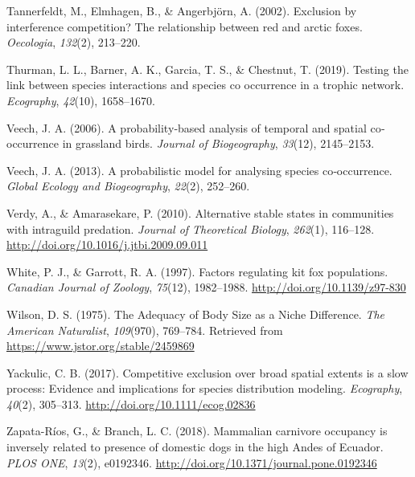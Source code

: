 \documentclass[12pt,twoside]{reedthesis}
\begin{document}
\leavevmode\hypertarget{ref-tannerfeldt_exclusion_2002}{}%
Tannerfeldt, M., Elmhagen, B., \& Angerbjörn, A. (2002). Exclusion by interference competition? The relationship between red and arctic foxes. \emph{Oecologia}, \emph{132}(2), 213--220.

\leavevmode\hypertarget{ref-thurman_testing_2019}{}%
Thurman, L. L., Barner, A. K., Garcia, T. S., \& Chestnut, T. (2019). Testing the link between species interactions and species co occurrence in a trophic network. \emph{Ecography}, \emph{42}(10), 1658--1670.

\leavevmode\hypertarget{ref-veech_probabilitybased_2006}{}%
Veech, J. A. (2006). A probability‐based analysis of temporal and spatial co‐occurrence in grassland birds. \emph{Journal of Biogeography}, \emph{33}(12), 2145--2153.

\leavevmode\hypertarget{ref-veech_probabilistic_2013}{}%
Veech, J. A. (2013). A probabilistic model for analysing species co‐occurrence. \emph{Global Ecology and Biogeography}, \emph{22}(2), 252--260.

\leavevmode\hypertarget{ref-verdy_alternative_2010}{}%
Verdy, A., \& Amarasekare, P. (2010). Alternative stable states in communities with intraguild predation. \emph{Journal of Theoretical Biology}, \emph{262}(1), 116--128. \url{http://doi.org/10.1016/j.jtbi.2009.09.011}

\leavevmode\hypertarget{ref-white_factors_1997}{}%
White, P. J., \& Garrott, R. A. (1997). Factors regulating kit fox populations. \emph{Canadian Journal of Zoology}, \emph{75}(12), 1982--1988. \url{http://doi.org/10.1139/z97-830}

\leavevmode\hypertarget{ref-wilson_adequacy_1975}{}%
Wilson, D. S. (1975). The Adequacy of Body Size as a Niche Difference. \emph{The American Naturalist}, \emph{109}(970), 769--784. Retrieved from \url{https://www.jstor.org/stable/2459869}

\leavevmode\hypertarget{ref-yackulic_competitive_2017}{}%
Yackulic, C. B. (2017). Competitive exclusion over broad spatial extents is a slow process: Evidence and implications for species distribution modeling. \emph{Ecography}, \emph{40}(2), 305--313. \url{http://doi.org/10.1111/ecog.02836}

\leavevmode\hypertarget{ref-zapata-rios_mammalian_2018}{}%
Zapata-Ríos, G., \& Branch, L. C. (2018). Mammalian carnivore occupancy is inversely related to presence of domestic dogs in the high Andes of Ecuador. \emph{PLOS ONE}, \emph{13}(2), e0192346. \url{http://doi.org/10.1371/journal.pone.0192346}


\end{document}
